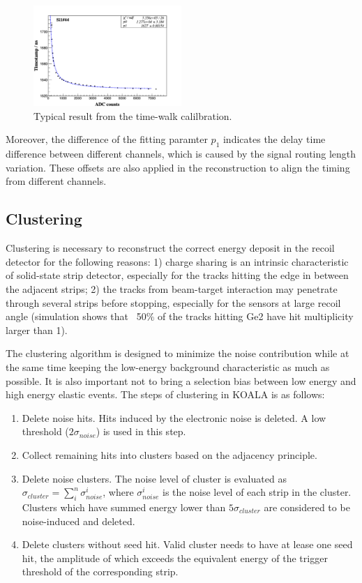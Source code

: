\documentclass[number,5p]{elsarticle}
\begin{document}
\begin{figure}[htbp]
  \centering
  \includegraphics[width=0.5\textwidth]{./timewalk.png}
  \caption{Typical result from the time-walk calilbration.}
  \label{fig:timewalk}
\end{figure}

Moreover, the difference of the fitting paramter \(p_1\) indicates the delay time
difference between different channels, which is caused by the signal routing length variation.
These offsets are also applied in the reconstruction to align the timing from different channels.

\subsection{Clustering}
\label{clustering}

Clustering is necessary to reconstruct the correct energy deposit in the
recoil detector for the following reasons: 1) charge sharing is an intrinsic characteristic of solid-state strip detector, especially
for the tracks hitting the edge in between the adjacent strips; 2) the tracks
from beam-target interaction may penetrate through several strips before
stopping, especially for the sensors at large recoil angle (simulation shows
that ~50\% of the tracks hitting Ge2 have hit multiplicity larger than 1).

The clustering algorithm is designed to minimize the noise contribution while
at the same time keeping the low-energy background characteristic as much as possible.
It is also important not to bring a selection bias between low energy and high energy elastic events.
The steps of clustering in KOALA is as follows:
\begin{enumerate}
\item Delete noise hits. Hits induced by the electronic noise is deleted. A low
  threshold ($2\sigma_{noise}$) is used in this step.
  \item Collect remaining hits into clusters based on the adjacency principle.
  \item Delete noise clusters. The noise level of cluster is evaluated as
    $\sigma_{cluster} = \sum_i^n{\sigma_{noise}^i}$, where $\sigma_{noise}^i$ is
    the noise level of each strip in the cluster. Clusters which have summed
    energy lower than $5\sigma_{cluster}$ are considered to be noise-induced and deleted.
  \item Delete clusters without seed hit. Valid cluster needs to have at lease one seed hit, the
    amplitude of which exceeds the equivalent energy of the trigger threshold of
    the corresponding strip.
\end{enumerate}
\end{document}
